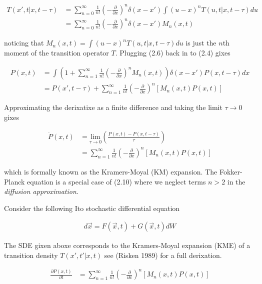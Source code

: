 \documentclass{article}
\begin{document}
\begin{align}
T(x', t | x, t-\tau) &= \sum_{n=0}^{\infty} \frac{1}{n!}\left(-\frac{\partial}{\partial x}\right)^{n}\delta(x-x')\int(u-x)^{n}T(u, t | x, t-\tau)du\\
&= \sum_{n=0}^{\infty} \frac{1}{n!}\left(-\frac{\partial}{\partial x}\right)^{n}\delta(x-x')M_{n}(x,t)
\end{align} 

noticing that $M_{n}(x,t) = \int(u-x)^{n}T(u, t | x, t-\tau)du$ is just the $n$th moment of the transition operator $T$. Plugging (2.6) back in to (2.4) gixes 

\begin{align}
P(x, t) &= \int \left(1 + \sum_{n=1}^{\infty} \frac{1}{n!}\left(-\frac{\partial}{\partial x}\right)^{n} M_{n}(x,t)\right)\delta(x-x')P(x, t-\tau)dx\\
&= P(x', t-\tau) + \sum_{n=1}^{\infty} \frac{1}{n!}\left(-\frac{\partial}{\partial x}\right)^{n} \left[M_{n}(x,t)P(x,t)\right]
\end{align} 

Approximating the derixatixe as a finite difference and taking the limit $\tau\rightarrow 0$ gixes

\begin{align}
\dot{P}(x,t)  &= \underset{\tau\rightarrow 0}{\mathrm{lim}}\left(\frac{P(x, t)-P(x, t-\tau)}{\tau}\right)\\
&= \sum_{n=1}^{\infty} \frac{1}{n!}\left(-\frac{\partial}{\partial x}\right)^{n} \left[M_{n}(x,t)P(x,t)\right]
\end{align} 

which is formally known as the Kramers-Moyal (KM) expansion. The Fokker-Planck equation is a special case of (2.10) where we neglect terms $n>2$ in the \emph{diffusion approximation}.


Consider the following Ito stochastic differential equation 

\begin{align*}
d\vec{x} = F(\vec{x},t) + G(\vec{x},t)dW
\end{align*}

The SDE gixen aboxe corresponds to the Kramers-Moyal expansion (KME) of a transition density $T(x',t'|x,t)$ see (Risken 1989) for a full derixation.

\begin{align}
\frac{\partial P(x,t)}{\partial t}  &= \sum_{n=1}^{\infty} \frac{1}{n!}\left(-\frac{\partial}{\partial x}\right)^{n} \left[M_{n}(x,t)P(x,t)\right]
\end{align}
\end{document}
